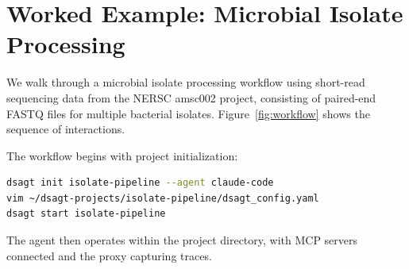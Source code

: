 \documentclass[11pt]{article}
\begin{document}
\section{Worked Example: Microbial Isolate Processing}

We walk through a microbial isolate processing workflow using
short-read sequencing data from the NERSC amsc002 project,
consisting of paired-end FASTQ files for multiple bacterial
isolates.
Figure~\ref{fig:workflow} shows the sequence of interactions.

The workflow begins with project initialization:

\begin{lstlisting}[language=bash]
dsagt init isolate-pipeline --agent claude-code
vim ~/dsagt-projects/isolate-pipeline/dsagt_config.yaml
dsagt start isolate-pipeline
\end{lstlisting}

\noindent
The agent then operates within the project directory, with
MCP servers connected and the proxy capturing traces.

\end{document}
